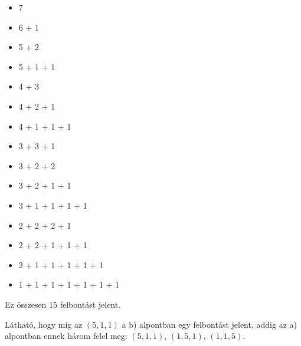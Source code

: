 \begin{problem}
\begin{enumerate}
\begin{minipage}[c]{0.3\textwidth}%
 \hspace{0cm} 
\begin{itemize}
\item[] 7 
\item[] 6 + 1 
\item[] 5 + 2 
\item[] 5 + 1 + 1 
\item[] 4 + 3 
\item[] 4 + 2 + 1 
\item[] 4 + 1 + 1 + 1 
\item[] 3 + 3 + 1 
\end{itemize}
\hspace{0cm} %
\end{minipage}%
\begin{minipage}[c]{0.45\textwidth}%
 \hspace{0cm} 
\begin{itemize}
\item[] 3 + 2 + 2 
\item[] 3 + 2 + 1 + 1 
\item[] 3 + 1 + 1 + 1 + 1 
\item[] 2 + 2 + 2 + 1 
\item[] 2 + 2 + 1 + 1 + 1 
\item[] 2 + 1 + 1 + 1 + 1 + 1 
\item[] 1 + 1 + 1 + 1 + 1 + 1 + 1 
\end{itemize}
\hspace{0cm} %
\end{minipage}

Ez összesen $15$ felbontást jelent. 

\end{enumerate}
\end{problem}
\begin{solution}
Látható, hogy míg az $(5,1,1)$ a b) alpontban egy felbontást jelent,
addig az a) alpontban ennek három felel meg: $(5,1,1)$, $(1,5,1)$,
$(1,1,5)$. 
\end{solution}

